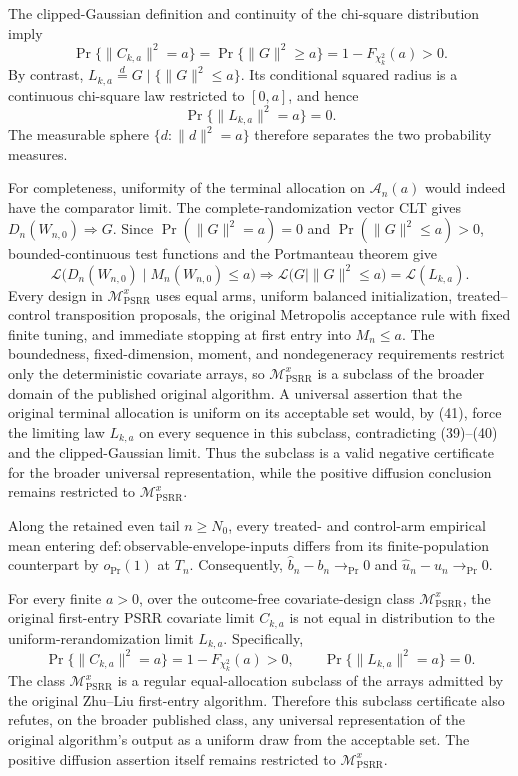 The clipped-Gaussian definition and continuity of the chi-square distribution imply
\[
 \Pr\{\|C_{k,a}\|^2=a\}
 =\Pr\{\|G\|^2\ge a\}
 =1-F_{\chi_k^2}(a)>0. \tag{39}
\]
By contrast, \(L_{k,a}\overset d=G\mid\{\|G\|^2\le a\}\).  Its conditional squared radius is a continuous chi-square law restricted to \([0,a]\), and hence
\[
 \Pr\{\|L_{k,a}\|^2=a\}=0. \tag{40}
\]
The measurable sphere \(\{d:\|d\|^2=a\}\) therefore separates the two probability measures.

For completeness, uniformity of the terminal allocation on \(\mathcal A_n(a)\) would indeed have the comparator limit.  The complete-randomization vector CLT gives \(D_n(W_{n,0})\Rightarrow G\).  Since \(\Pr(\|G\|^2=a)=0\) and \(\Pr(\|G\|^2\le a)>0\), bounded-continuous test functions and the Portmanteau theorem give
\[
 \mathcal L\bigl(D_n(W_{n,0})\mid M_n(W_{n,0})\le a\bigr)
 \Rightarrow \mathcal L\bigl(G\mid\|G\|^2\le a\bigr)
 =\mathcal L(L_{k,a}). \tag{41}
\]
Every design in \(\mathcal M_{\mathrm{PSRR}}^x\) uses equal arms, uniform balanced initialization, treated--control transposition proposals, the original Metropolis acceptance rule with fixed finite tuning, and immediate stopping at first entry into \(M_n\le a\).  The boundedness, fixed-dimension, moment, and nondegeneracy requirements restrict only the deterministic covariate arrays, so \(\mathcal M_{\mathrm{PSRR}}^x\) is a subclass of the broader domain of the published original algorithm.  A universal assertion that the original terminal allocation is uniform on its acceptable set would, by (41), force the limiting law \(L_{k,a}\) on every sequence in this subclass, contradicting (39)--(40) and the clipped-Gaussian limit.  Thus the subclass is a valid negative certificate for the broader universal representation, while the positive diffusion conclusion remains restricted to \(\mathcal M_{\mathrm{PSRR}}^x\).

Along the retained even tail \(n\ge N_0\), every treated- and control-arm empirical mean entering \(\mathrm{def{:}observable\mbox{-}envelope\mbox{-}inputs}\) differs from its finite-population counterpart by \(o_{\Pr}(1)\) at \(T_n\). Consequently, \(\widehat b_n-b_n\to_{\Pr}0\) and \(\widehat u_n-u_n\to_{\Pr}0\).

For every finite \(a>0\), over the outcome-free covariate-design class \(\mathcal M_{\mathrm{PSRR}}^{x}\), the original first-entry PSRR covariate limit \(C_{k,a}\) is not equal in distribution to the uniform-rerandomization limit \(L_{k,a}\). Specifically,
\[
 \Pr\{\|C_{k,a}\|^2=a\}=1-F_{\chi_k^2}(a)>0,
 \qquad
 \Pr\{\|L_{k,a}\|^2=a\}=0.
\]
The class \(\mathcal M_{\mathrm{PSRR}}^{x}\) is a regular equal-allocation subclass of the arrays admitted by the original Zhu--Liu first-entry algorithm. Therefore this subclass certificate also refutes, on the broader published class, any universal representation of the original algorithm's output as a uniform draw from the acceptable set. The positive diffusion assertion itself remains restricted to \(\mathcal M_{\mathrm{PSRR}}^{x}\).
